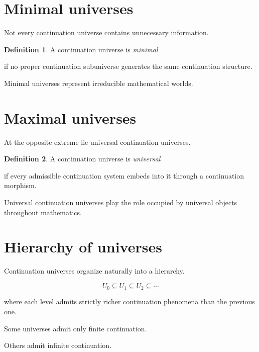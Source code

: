 \documentclass[13pt,openany]{book}
\theoremstyle{plain}
\theoremstyle{definition}
\newtheorem{definition}{Definition}[chapter]
\begin{document}
\section{Minimal universes}

Not every continuation universe contains unnecessary information.

\begin{definition}

A continuation universe is
\emph{minimal}

if no proper continuation subuniverse generates the same continuation structure.

\end{definition}

Minimal universes represent irreducible mathematical worlds.


\section{Maximal universes}

At the opposite extreme lie universal continuation universes.

\begin{definition}

A continuation universe is
\emph{universal}

if every admissible continuation system embeds into it through a continuation morphism.

\end{definition}

Universal continuation universes play the role occupied by universal objects throughout mathematics.


\section{Hierarchy of universes}

Continuation universes organize naturally into a hierarchy.

\[
U_0
\subseteq
U_1
\subseteq
U_2
\subseteq
\cdots
\]

where each level admits strictly richer continuation phenomena than the previous one.

Some universes admit only finite continuation.

Others admit infinite continuation.
\end{document}
